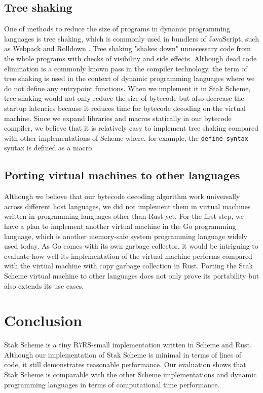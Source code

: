 \documentclass[sigplan, anonymous, review]{acmart}
\begin{document}
\subsection{Tree shaking}

One of methods to reduce the size of programs in dynamic programming
languages is tree shaking\cite{treeshaking}, which is commonly used
in bundlers of JavaScript, such as Webpack \cite{webpack} and Rolldown
\cite{rolldown}.
Tree shaking "shakes down" unnecessary code from
the whole programs with checks of visibility and side effects.
Although dead code elimination is a commonly known pass in the
compiler technology, the term of tree shaking is used
in the context of dynamic programming languages where we do not define
any entrypoint functions.
When we implement it in Stak Scheme, tree shaking would not only
reduce the size of bytecode but also decrease the startup latencies
because it reduces time for bytecode decoding on the virtual machine.
Since we expand libraries and macros statically
in our bytecode compiler, we believe that it is relatively easy to
implement tree shaking compared with other implementations of Scheme
where, for example, the \texttt{define-syntax} syntax is defined as a macro.

\subsection{Porting virtual machines to other languages} \label{portvm}

Although we believe that our bytecode decoding algorithm work
universally across different host languages, we did not implement them in
virtual machines written in programming languages other than Rust yet.
For the first step, we have a plan to implement another virtual
machine in the Go programming language, which is another memory-safe system
programming language widely used today.
As Go comes with its own garbage collector,
it would be intriguing to evaluate how well its implementation of the
virtual machine performs compared with the virtual
machine with copy garbage collection in Rust.
Porting the Stak Scheme virtual machine to other languages does
not only prove its portability but also extends its use cases.

\section{Conclusion}

Stak Scheme is a tiny R7RS-small implementation written in Scheme and
Rust.
Although our implementation of Stak Scheme is minimal in terms of
lines of code, it still demonstrates reasonable performance.
Our evaluation shows that Stak Scheme is
comparable with the other Scheme implementations and dynamic
programming languages in terms of computational time performance.
\end{document}
